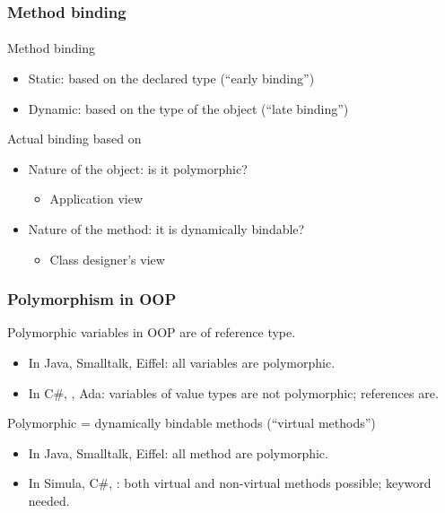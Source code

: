 \documentclass{beamer}
\begin{document}
\begin{frame}[fragile]
\frametitle{Method binding}
\framesubtitle{}
Method binding
\begin{itemize}
\item Static: based on the declared type (``early binding'')
\item Dynamic: based on the type of the object  (``late binding'')
\end{itemize}
\bigskip

Actual binding based on
\begin{itemize}
\item Nature of the object: is it polymorphic?
\begin{itemize}
\item Application view
\end{itemize}
\item Nature of the method: it is dynamically bindable?
\begin{itemize}
\item Class designer's view
\end{itemize}
\end{itemize}
\end{frame}


\begin{frame}
\frametitle{Polymorphism in OOP}
Polymorphic variables in OOP are of reference type.
\begin{itemize}
\item In Java, Smalltalk, Eiffel: all variables are polymorphic.
\item In C\#, \Cpp, Ada: variables of value types are not polymorphic;
references are. 
\end{itemize}
\bigskip

Polymorphic = dynamically bindable methods (``virtual methods'') 
 
\begin{itemize}
\item In Java, Smalltalk, Eiffel: all method are polymorphic.
\item In Simula, C\#, \Cpp:  both virtual and non-virtual methods possible;
 keyword needed. 
\end{itemize}
\end{frame}
\end{document}
